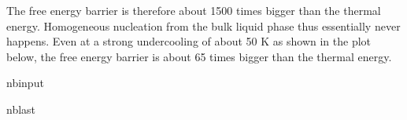 \documentclass[letterpaper,10pt,english]{sphinxmanual}
\begin{document}
\sphinxAtStartPar
The free energy barrier is therefore about 1500 times bigger than the thermal energy. Homogeneous nucleation from the bulk liquid phase thus essentially never happens. Even at a strong undercooling of about 50 K as shown in the plot below, the free energy barrier is about 65 times bigger than the thermal energy.

\begin{sphinxuseclass}{nbinput}
\begin{sphinxuseclass}{nblast}
{
\begin{sphinxVerbatim}[commandchars=\\\{\}]
\llap{\color{nbsphinxin}[8]:\,\hspace{\fboxrule}\hspace{\fboxsep}} 
     
     
\end{sphinxVerbatim}
}

\end{sphinxuseclass}
\end{sphinxuseclass}
\end{document}
